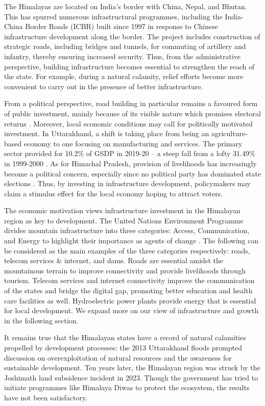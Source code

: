 \documentclass[a4paper,12pt]{article}
\begin{document}
The Himalayas are located on India’s border with China, Nepal, and Bhutan. This has spurred numerous infrastructural programmes, including the India-China Border Roads (ICBR) built since 1997 \parencite{mha_n.d.} in response to Chinese infrastructure development along the border. The project includes construction of strategic roads, including bridges and tunnels, for commuting of artillery and infantry, thereby ensuring increased security. Thus, from the administrative perspective, building infrastructure becomes essential to strengthen the reach of the state. For example, during a natural calamity, relief efforts become more convenient to carry out in the presence of better infrastructure.

From a political perspective, road building in particular remains a favoured form of public investment, mainly because of its visible nature which promises electoral returns \parencite{berg2015}. Moreover, local economic conditions may call for politically motivated investment. In Uttarakhand, a shift is taking place from being an agriculture-based economy to one focusing on manufacturing and services. The primary sector provided for 10.2\% of GSDP in 2019-20 – a steep fall from a lofty 31.49\% in 1999-2000 \parencite{directorate2021}. As for Himachal Pradesh, provision of livelihoods has increasingly become a political concern, especially since no political party has dominated state elections \parencite{kumar2022}. Thus, by investing in infrastructure development, policymakers may claim a stimulus effect for the local economy hoping to attract voters.

The economic motivation views infrastructure investment in the Himalayan region as key to development. The United Nations Environment Programme divides mountain infrastructure into three categories: Access, Communication, and Energy to highlight their importance as agents of change \parencite{kohler2002}. The following can be considered as the main examples of the three categories respectively: roads, telecom services \& internet, and dams. Roads are essential amidst the mountainous terrain to improve connectivity and provide livelihoods through tourism. Telecom services and internet connectivity improve the communication of the states and bridge the digital gap, promoting better education and health care facilities as well. Hydroelectric power plants provide energy that is essential for local development. We expand more on our view of infrastructure and growth in the following section.

It remains true that the Himalayan states have a record of natural calamities propelled by development processes: the 2013 Uttarakhand floods prompted discussion on overexploitation of natural resources and the awareness for sustainable development. Ten years later, the Himalayan region was struck by the Joshimath land subsidence incident in 2023. Though the government has tried to initiate programmes like Himalaya Diwas \parencite{press2021} to protect the ecosystem, the results have not been satisfactory.
\end{document}
